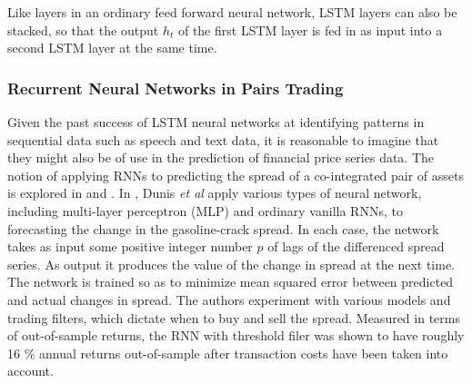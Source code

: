 \documentclass{article}
\begin{document}
Like layers in an ordinary feed forward neural network, LSTM layers can also be stacked, so that the output $h_{t}$ of the first LSTM layer is fed in as input into a second LSTM layer at the same time. 














\subsubsection{Recurrent Neural Networks in Pairs Trading}

Given the past success of LSTM neural networks at identifying patterns in sequential data such as speech and text data, it is reasonable to imagine that they might also be of use in the prediction of financial price series data. 
The notion of applying RNNs to predicting the spread of a co-integrated pair of assets is explored in \cite{dunis2006modelling} and \cite{van2017pairs}. In \cite{dunis2006modelling}, Dunis \textit{et al} apply various types of neural network, including multi-layer perceptron (MLP) and ordinary vanilla RNNs, to forecasting the change in the gasoline-crack spread. In each case, the network takes as input some positive integer number $p$ of lags of the differenced spread series. As output it produces the value of the change in spread at the next time. The network is trained so as to minimize mean squared error between predicted and actual changes in spread. The authors experiment with various models and trading filters, which dictate when to buy and sell the spread. Measured in terms of out-of-sample returns, the RNN with threshold filer was shown to have roughly 16 \% annual returns out-of-sample after transaction costs have been taken into account. 
 
\end{document}

